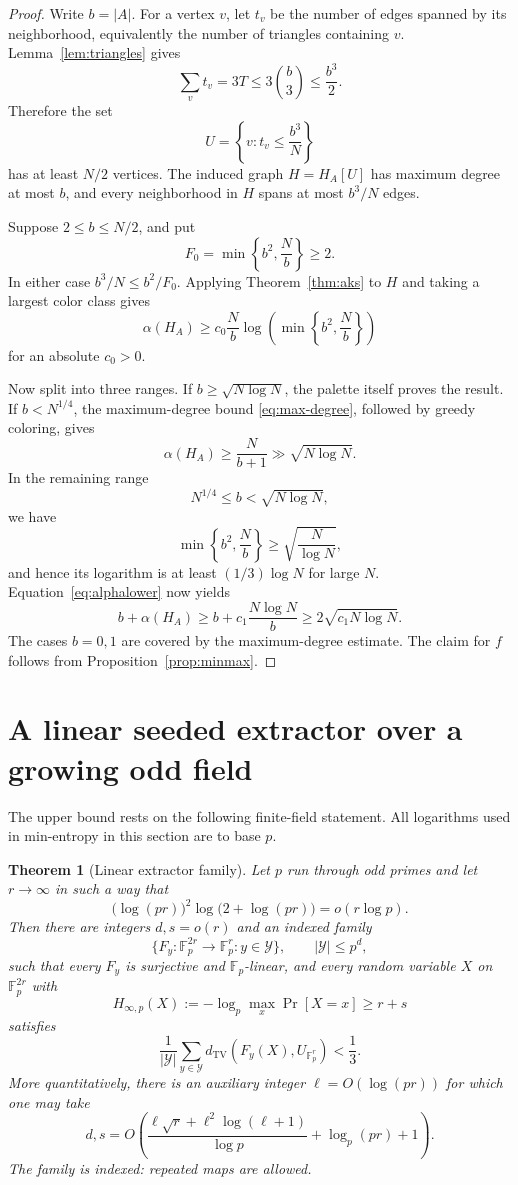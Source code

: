 \documentclass[11pt]{article}
\numberwithin{equation}{section}
\newtheorem{theorem}{Theorem}[section]
\theoremstyle{definition}
\theoremstyle{remark}
\newcommand{\F}{\mathbb F}
\newcommand{\TV}{d_{\mathrm{TV}}}
\begin{document}
\begin{proof}
Write $b=|A|$.  For a vertex $v$, let $t_v$ be the number of edges
spanned by its neighborhood, equivalently the number of triangles
containing $v$.  Lemma~\ref{lem:triangles} gives
\[
 \sum_v t_v=3T\le3\binom b3\le\frac{b^3}{2}.
\]
Therefore the set
\[
 U=\left\{v:t_v\le\frac{b^3}{N}\right\}
\]
has at least $N/2$ vertices.  The induced graph $H=H_A[U]$ has maximum
degree at most $b$, and every neighborhood in $H$ spans at most $b^3/N$
edges.

Suppose $2\le b\le N/2$, and put
\[
 F_0=\min\left\{b^2,\frac Nb\right\}\ge2.
\]
In either case $b^3/N\le b^2/F_0$.  Applying
Theorem~\ref{thm:aks} to $H$ and taking a largest color class gives
\begin{equation}\label{eq:alphalower}
 \alpha(H_A)\ge
 c_0\frac Nb\log\!\left(\min\left\{b^2,\frac Nb\right\}\right)
\end{equation}
for an absolute $c_0>0$.

Now split into three ranges.  If $b\ge\sqrt{N\log N}$, the palette
itself proves the result.  If $b<N^{1/4}$, the maximum-degree bound
\eqref{eq:max-degree}, followed by greedy coloring, gives
\[
 \alpha(H_A)\ge\frac{N}{b+1}\gg\sqrt{N\log N}.
\]
In the remaining range
\[
 N^{1/4}\le b<\sqrt{N\log N},
\]
we have
\[
 \min\left\{b^2,\frac Nb\right\}
 \ge\sqrt{\frac{N}{\log N}},
\]
and hence its logarithm is at least $(1/3)\log N$ for large $N$.
Equation~\eqref{eq:alphalower} now yields
\[
 b+\alpha(H_A)\ge b+c_1\frac{N\log N}{b}
 \ge2\sqrt{c_1N\log N}.
\]
The cases $b=0,1$ are covered by the maximum-degree estimate.  The claim
for $f$ follows from Proposition~\ref{prop:minmax}.
\end{proof}

\section{A linear seeded extractor over a growing odd field}
\label{sec:extractor}

The upper bound rests on the following finite-field statement.  All
logarithms used in min-entropy in this section are to base $p$.

\begin{theorem}[Linear extractor family]\label{thm:linear-family}
Let $p$ run through odd primes and let $r\to\infty$ in such a way that
\[
 \bigl(\log(pr)\bigr)^2\log\bigl(2+\log(pr)\bigr)
 =o(r\log p).
\]
Then there are integers $d,s=o(r)$ and an indexed family
\[
 \{F_y:\F_p^{2r}\to\F_p^r:y\in\mathcal Y\},
 \qquad |\mathcal Y|\le p^d,
\]
such that every $F_y$ is surjective and $\F_p$-linear, and every random
variable $X$ on $\F_p^{2r}$ with
\[
 H_{\infty,p}(X):=-\log_p\max_x\Pr[X=x]\ge r+s
\]
satisfies
\[
 \frac1{|\mathcal Y|}\sum_{y\in\mathcal Y}
 \TV(F_y(X),U_{\F_p^r})<\frac13.
\]
More quantitatively, there is an auxiliary integer
$\ell=O(\log(pr))$ for which one may take
\[
 d,s=O\left(
 \frac{\ell\sqrt r+\ell^2\log(\ell+1)}{\log p}
 +\log_p(pr)+1\right).
\]
The family is indexed: repeated maps are allowed.
\end{theorem}
\end{document}
